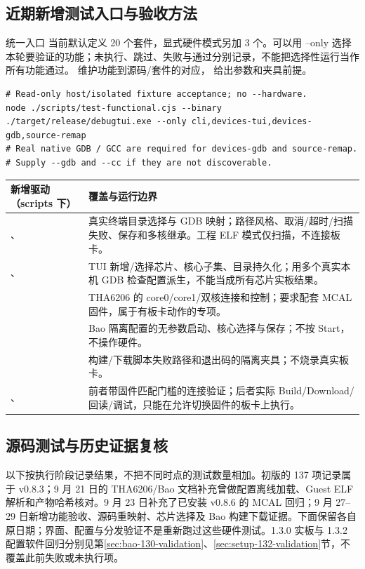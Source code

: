 \documentclass[UTF8,a4paper,11pt,oneside,fontset=none]{ctexart}
\begin{document}
\subsection{近期新增测试入口与验收方法}
统一入口  当前默认定义 20 个套件，显式硬件模式另加 3 个。可以用 --only 选择本轮要验证的功能；未执行、跳过、失败与通过分别记录，不能把选择性运行当作所有功能通过。 维护功能到源码/套件的对应， 给出参数和夹具前提。
\par\noindent\begin{minipage}{\linewidth}
\begin{lstlisting}
# Read-only host/isolated fixture acceptance; no --hardware.
node ./scripts/test-functional.cjs --binary ./target/release/debugtui.exe --only cli,devices-tui,devices-gdb,source-remap
# Real native GDB / GCC are required for devices-gdb and source-remap.
# Supply --gdb and --cc if they are not discoverable.
\end{lstlisting}
\end{minipage}\par
\begin{longtable}{@{}P{56mm}P{105mm}@{}}\toprule
新增驱动（scripts 下） & 覆盖与运行边界\\\midrule\endhead
{}、 & 真实终端目录选择与 GDB 映射；路径风格、取消/超时/扫描失败、保存和多核继承。工程 ELF 模式仅扫描，不连接板卡。\\
、 & TUI 新增/选择芯片、核心子集、目录持久化；用多个真实本机 GDB 检查配置派生，不能当成所有芯片实板结果。\\
 & THA6206 的 core0/core1/双核连接和控制；要求配套 MCAL 固件，属于有板卡动作的专项。\\
 & Bao 隔离配置的无参数启动、核心选择与保存；不按 Start，不操作硬件。\\
 & 构建/下载脚本失败路径和退出码的隔离夹具；不烧录真实板卡。\\
、 & 前者带固件匹配门槛的连接验证；后者实际 Build/Download/回读/调试，只能在允许切换固件的板卡上执行。\\\bottomrule
\end{longtable}

\subsection{源码测试与历史证据复核}
以下按执行阶段记录结果，不把不同时点的测试数量相加。初版的 137 项记录属于 v0.8.3；9 月 21 日的 THA6206/Bao 文档补充曾做配置离线加载、Guest ELF 解析和产物哈希核对。9 月 23 日补充了已安装 v0.8.6 的 MCAL 回归；9 月 27--29 日新增功能验收、源码重映射、芯片选择及 Bao 构建下载证据。下面保留各自原日期；界面、配置与分发验证不是重新跑过这些硬件测试。1.3.0 实板与 1.3.2 配置软件回归分别见第\ref{sec:bao-130-validation}、\ref{sec:setup-132-validation}节，不覆盖此前失败或未执行项。
\end{document}
